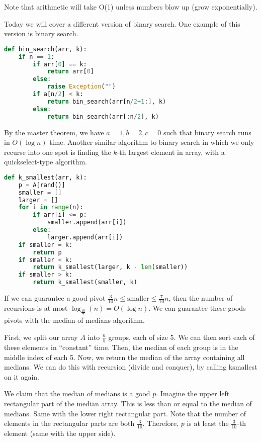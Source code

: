 
Note that arithmetic will take O(1) unless numbers blow up (grow exponentially).

Today we will cover a different version of binary search. One example of this version is binary search.

\begin{lstlisting}[language=Python]
def bin_search(arr, k):
	if n == 1:
		if arr[0] == k:
			return arr[0]
		else:
			raise Exception("")
		if a[n/2] < k:
			return bin_search(arr[n/2+1:], k)
		else:
			return bin_search(arr[:n/2], k)
\end{lstlisting}

By the master theorem, we have \( a=1, b=2, c=0 \) such that binary search runs in \( O(\log n) \) time. Another similar algorithm to binary search in which we only recurse into one spot is finding the \( k \)-th largest element in array, with a quickselect-type algorithm.

\begin{lstlisting}[language=Python]
def k_smallest(arr, k):
	p = A[rand()]
	smaller = []
	larger = []
	for i in range(n):
		if arr[i] <= p:
			smaller.append(arr[i])
		else:
			larger.append(arr[i])
	if smaller = k:
		return p
	if smaller < k:
		return k_smallest(larger, k - len(smaller))
	if smaller > k:
		return k_smallest(smaller, k)
\end{lstlisting}

If we can guarantee a good pivot \( \frac{3}{10}n \le \text{smaller} \le \frac{7}{10}n \), then the number of recursions is at most \( \log _{\frac{10}{7}}(n) = O(\log n) \). We can guarantee these goods pivots with the median of medians algorithm.

First, we split our array \( A \) into \( \frac{n}{5} \) groups, each of size 5. We can then sort each of these elements in ``constant'' time. Then, the median of each group is in the middle index of each 5. Now, we return the median of the array containing all medians. We can do this with recursion (divide and conquer), by calling ksmallest on it again.

We claim that the median of medians is a good \( p \). Imagine the upper left rectangular part of the median array. This is less than or equal to the median of medians. Same with the lower right rectangular part. Note that the number of elements in the rectangular parts are both \( \frac{3}{10} \). Therefore, \( p \) is at least the \( \frac{3}{10} \)-th element (same with the upper side).
